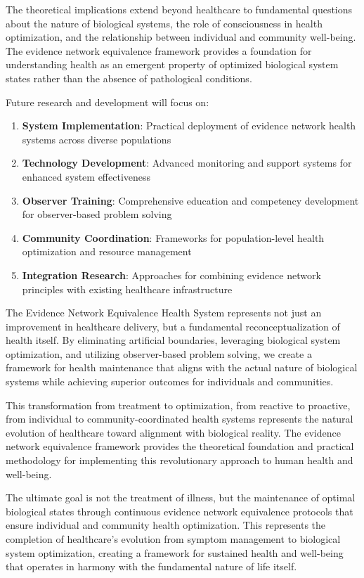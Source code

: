 \documentclass[12pt,a4paper]{article}
\begin{document}
The theoretical implications extend beyond healthcare to fundamental questions about the nature of biological systems, the role of consciousness in health optimization, and the relationship between individual and community well-being. The evidence network equivalence framework provides a foundation for understanding health as an emergent property of optimized biological system states rather than the absence of pathological conditions.

Future research and development will focus on:

\begin{enumerate}
\item \textbf{System Implementation}: Practical deployment of evidence network health systems across diverse populations
\item \textbf{Technology Development}: Advanced monitoring and support systems for enhanced system effectiveness
\item \textbf{Observer Training}: Comprehensive education and competency development for observer-based problem solving
\item \textbf{Community Coordination}: Frameworks for population-level health optimization and resource management
\item \textbf{Integration Research}: Approaches for combining evidence network principles with existing healthcare infrastructure
\end{enumerate}

The Evidence Network Equivalence Health System represents not just an improvement in healthcare delivery, but a fundamental reconceptualization of health itself. By eliminating artificial boundaries, leveraging biological system optimization, and utilizing observer-based problem solving, we create a framework for health maintenance that aligns with the actual nature of biological systems while achieving superior outcomes for individuals and communities.

This transformation from treatment to optimization, from reactive to proactive, from individual to community-coordinated health systems represents the natural evolution of healthcare toward alignment with biological reality. The evidence network equivalence framework provides the theoretical foundation and practical methodology for implementing this revolutionary approach to human health and well-being.

The ultimate goal is not the treatment of illness, but the maintenance of optimal biological states through continuous evidence network equivalence protocols that ensure individual and community health optimization. This represents the completion of healthcare's evolution from symptom management to biological system optimization, creating a framework for sustained health and well-being that operates in harmony with the fundamental nature of life itself.


\end{document}
